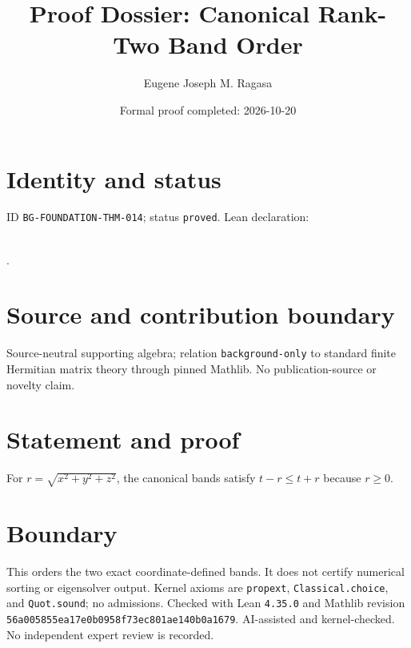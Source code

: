 \documentclass[11pt]{article}
\title{Proof Dossier: Canonical Rank-Two Band Order}\author{Eugene Joseph M. Ragasa}\date{Formal proof completed: 2026-10-20}
\begin{document}
\maketitle
\section{Identity and status}
ID \texttt{BG-FOUNDATION-THM-014}; status \texttt{proved}. Lean declaration:
\par{}\\
{\tiny{}}.
\section{Source and contribution boundary}
Source-neutral supporting algebra; relation \texttt{background-only} to standard finite
Hermitian matrix theory through pinned Mathlib. No publication-source or novelty claim.
\section{Statement and proof}
For $r=\sqrt{x^2+y^2+z^2}$, the canonical bands satisfy $t-r\le t+r$ because
$r\ge0$.
\section{Boundary}
This orders the two exact coordinate-defined bands. It does not certify numerical
sorting or eigensolver output. Kernel axioms are \texttt{propext},
\texttt{Classical.choice}, and \texttt{Quot.sound}; no admissions. Checked with Lean \texttt{4.35.0} and Mathlib revision \texttt{56a005855ea17e0b0958f73ec801ae140b0a1679}. AI-assisted and kernel-checked. No independent expert review is recorded.
\end{document}
